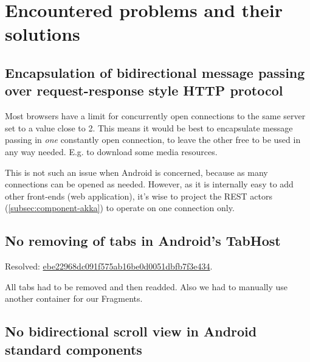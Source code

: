 \section{Encountered problems and their solutions}
\label{sec:impl-problems}

\subsection{Encapsulation of bidirectional message passing over request-response style HTTP protocol}
\label{subsec:problem-longpolling}


Most browsers have a limit for concurrently open connections to the same server set to a value close to 2. This means it would be best to encapsulate message passing in \emph{one} constantly open connection, to leave the other free to be used in any way needed. E.g. to download some media resources.

This is not such an issue when Android is concerned, because as many connections can be opened as needed. However, as it is internally easy to add other front-ends (web application), it's wise to project the REST actors (\cref{subsec:component-akka}) to operate on one connection only.

\subsection{No removing of tabs in Android's TabHost}
\label{subsec:problem-tabhost}


Resolved: \href{https://github.com/michalrus/agh-mindmap/commit/ebe22968dc091f575ab16be0d0051dbfb7f3e434}{ebe22968dc091f575ab16be0d0051dbfb7f3e434}.

All tabs had to be removed and then readded. Also we had to manually use another container for our Fragments.

\subsection{No bidirectional scroll view in Android standard components}
\label{subsec:problem-scrollview}

